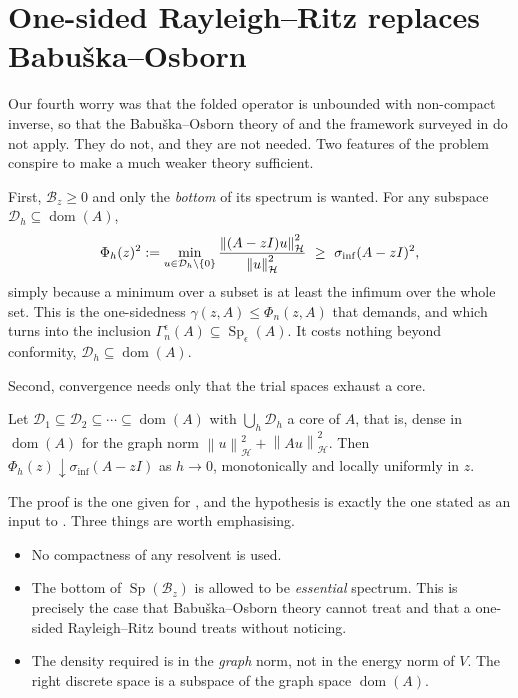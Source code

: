 \documentclass[11pt,a4paper]{article}
\theoremstyle{plain}
\newcommand{\norm}[1]{\left\|#1\right\|}
\newcommand{\Hb}{\mathcal{H}}
\newcommand{\Vb}{V}
\newcommand{\Bop}{\mathcal{B}}
\newcommand{\Dop}{\mathcal{D}}
\newcommand{\spec}{\sigma}
\DeclareMathOperator{\dom}{dom}
\DeclareMathOperator{\Sp}{Sp}
\newcommand{\siginf}{\spec_{\inf}}
\begin{document}
\section{One-sided Rayleigh--Ritz replaces Babu\v{s}ka--Osborn}
\label{sec:rayleigh}

Our fourth worry was that the folded operator is unbounded with non-compact
inverse, so that the Babu\v{s}ka--Osborn theory of \cite{BabuskaOsborn1991} and
the framework surveyed in \cite{Boffi2010} do not apply.  They do not, and they
are not needed.  Two features of the problem conspire to make a much weaker
theory sufficient.

First, $\Bop_z \ge 0$ and only the \emph{bottom} of its spectrum is wanted.  For
any subspace $\Dop_h \subseteq \dom(A)$,
\begin{equation}
  \label{eq:onesided}
  \Phi_h(z)^2 := \min_{u \in \Dop_h \setminus\{0\}}
     \frac{\norm{(A-zI)u\vphantom{|}}^2_{\Hb}}{\norm{u}^2_{\Hb}}
  \ \ge\ \siginf(A - zI)^2 ,
\end{equation}
simply because a minimum over a subset is at least the infimum over the whole
set.  This is the one-sidedness $\gamma(z,A) \le \Phi_n(z,A)$ that
\cite[Assumption~3.2.1]{Colbrook2026} demands, and which
\cite[Theorem~3.2.3]{Colbrook2026} turns into the inclusion $\Gamma_n^\epsilon(A)
\subseteq \Sp_\epsilon(A)$.  It costs nothing beyond conformity, $\Dop_h
\subseteq \dom(A)$.

Second, convergence needs only that the trial spaces exhaust a core.

\begin{proposition}
  \label{prop:core}
  Let $\Dop_1 \subseteq \Dop_2 \subseteq \cdots \subseteq \dom(A)$ with
  $\bigcup_h \Dop_h$ a core of $A$, that is, dense in $\dom(A)$ for the graph
  norm $\norm{u}^2_{\Hb} + \norm{Au}^2_{\Hb}$.  Then $\Phi_h(z) \downarrow
  \siginf(A - zI)$ as $h \to 0$, monotonically and locally uniformly in $z$.
\end{proposition}

The proof is the one given for \cite[Lemma~1.2.6]{Colbrook2026}, and the
hypothesis is exactly the one stated as an input to
\cite[Algorithm~3.4]{Colbrook2026}.  Three things are worth emphasising.

\begin{itemize}
  \item No compactness of any resolvent is used.
  \item The bottom of $\Sp(\Bop_z)$ is allowed to be \emph{essential} spectrum.
        This is precisely the case that Babu\v{s}ka--Osborn theory cannot treat
        and that a one-sided Rayleigh--Ritz bound treats without noticing.
  \item The density required is in the \emph{graph} norm, not in the energy
        norm of $\Vb$.  The right discrete space is a subspace of the graph
        space $\dom(A)$.
\end{itemize}
\end{document}
